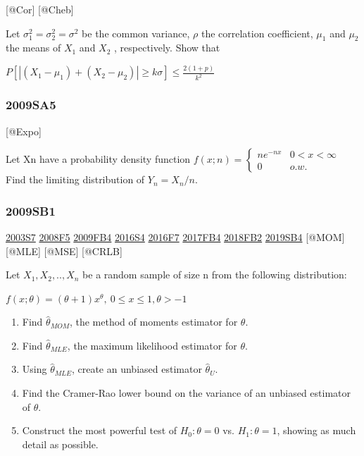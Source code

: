 \documentclass[6pt,Portrait]{article}
\begin{document}
{[}@Cor{]} {[}@Cheb{]}

Let \(\sigma_1^2=\sigma_2^2=\sigma^2\) be the common variance, \(\rho\)
the correlation coefficient, \(\mu_1\) and \(\mu_2\) the means of
\(X_1\) and \(X_2\) , respectively. Show that

\(P[|(X_1-\mu_1)+(X_2-\mu_2)|\ge k\sigma]\le\frac{2(1+p)}{k^2}\)

\hypertarget{sa5}{%
\subsubsection{2009SA5}\label{sa5}}

{[}@Expo{]}

Let Xn have a probability density function
\(f(x;n)=\begin{cases}ne^{-nx}& 0<x<\infty\\0& o.w.\end{cases}\) Find
the limiting distribution of \(Y_n=X_n/n\).

\hypertarget{sb1}{%
\subsubsection{2009SB1}\label{sb1}}

\protect\hyperlink{s7}{2003S7} \protect\hyperlink{f5-3}{2008F5}
\protect\hyperlink{fb4}{2009FB4} \protect\hyperlink{s4-4}{2016S4}
\protect\hyperlink{f7-5}{2016F7} \protect\hyperlink{fb4-3}{2017FB4}
\protect\hyperlink{fb2-4}{2018FB2} \protect\hyperlink{sb4-2}{2019SB4}
{[}@MOM{]} {[}@MLE{]} {[}@MSE{]} {[}@CRLB{]}

Let \(X_1,X_2,..,X_n\) be a random sample of size n from the following
distribution:

\(f(x;\theta)=(\theta+1)x^\theta,\ 0\le x\le 1,\theta>-1\)

\begin{enumerate}
\def\labelenumi{(\alph{enumi})}
\item
  Find \(\hat\theta_{MOM}\), the method of moments estimator for
  \(\theta\).
\item
  Find \(\hat\theta_{MLE}\), the maximum likelihood estimator for
  \(\theta\).
\item
  Using \(\hat\theta_{MLE}\), create an unbiased estimator
  \(\hat\theta_{U}\).
\item
  Find the Cramer-Rao lower bound on the variance of an unbiased
  estimator of \(\theta\).
\item
  Construct the most powerful test of \(H_0:\theta=0\) vs.
  \(H_1:\theta=1\), showing as much detail as possible.
\end{enumerate}
\end{document}
